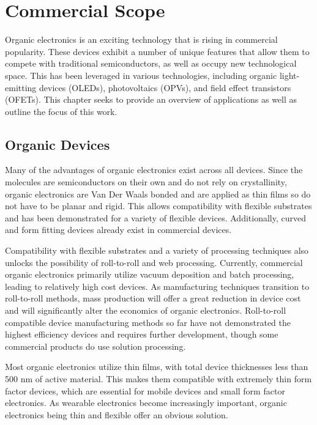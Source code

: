 \documentclass[../thesis.tex]{subfiles}
\begin{document}
\chapter{Commercial Scope}


Organic electronics is an exciting technology that is rising in commercial popularity.\supercite{Kenning2017,Soneira2016,Soneira2017}
These devices exhibit a number of unique features that allow them to compete with traditional semiconductors, as well as occupy new technological space.
This has been leveraged in various technologies, including organic light-emitting devices (OLEDs), photovoltaics (OPVs), and field effect transistors (OFETs).\supercite{Dimitrakopoulos2002,P.Gaj2016,Peumans2003}
This chapter seeks to provide an overview of applications as well as outline the focus of this work.

\section{Organic Devices}

Many of the advantages of organic electronics exist across all devices.  
Since the molecules are semiconductors on their own and do not rely on crystallinity, organic electronics are Van Der Waals bonded and are applied as thin films so do not have to be planar and rigid.  
This allows compatibility with flexible substrates and has been demonstrated for a variety of flexible devices.\supercite{Park2011,Gu1997,Sugimoto2004}
Additionally, curved and form fitting devices already exist in commercial devices.\supercite{Cok2005,Han2014a}

Compatibility with flexible substrates and a variety of processing techniques also unlocks the possibility of roll-to-roll and web processing.\supercite{Sondergaard2013}
Currently, commercial organic electronics primarily utilize vacuum deposition and batch processing, leading to relatively high cost devices.\supercite{Hung2015,Tsujimura2012}
As manufacturing techniques transition to roll-to-roll methods, mass production will offer a great reduction in device cost and will significantly alter the economics of organic electronics.
Roll-to-roll compatible device manufacturing methods so far have not demonstrated the highest efficiency devices and requires further development, though some commercial products do use solution processing.\supercite{Fahlteich,Manners2016,Mertens2016}

Most organic electronics utilize thin films, with total device thicknesses less than 500 nm of active material.  
This makes them compatible with extremely thin form factor devices, which are essential for mobile devices and small form factor electronics.
As wearable electronics become increasingly important, organic electronics being thin and flexible offer an obvious solution.
\end{document}
